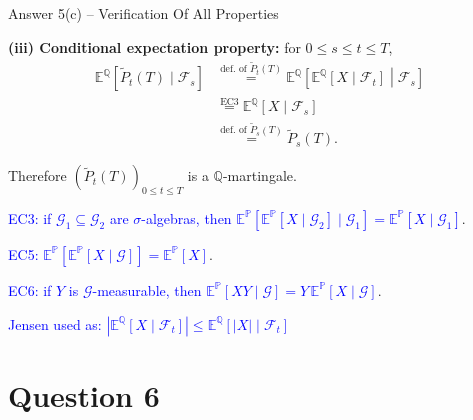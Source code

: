 \documentclass[compress]{beamer}
\begin{document}
\begin{frame}{Answer 5(c) -- Verification Of All Properties}
    {\small
    

    \textbf{(iii) Conditional expectation property:} for $0\le s\le t\le T$,
    \begin{align*}
        \mathbb E^{\mathbb Q}[\widetilde P_t(T)\mid\mathcal F_s]
        &\overset{\text{def. of }\widetilde P_t(T)}{=}
        \mathbb E^{\mathbb Q}\!\left[\mathbb E^{\mathbb Q}[X\mid\mathcal F_t]\middle|\mathcal F_s\right]\\
        &\overset{\text{EC3}}{=}
        \mathbb E^{\mathbb Q}[X\mid\mathcal F_s]\\
        &\overset{\text{def. of }\widetilde P_s(T)}{=}
        \widetilde P_s(T).
    \end{align*}

    Therefore $(\widetilde P_t(T))_{0\le t\le T}$ is a $\mathbb Q$-martingale.

	\vspace{4em}

	
	\textcolor{blue}{EC3: if $\mathcal G_1\subseteq \mathcal G_2$ are $\sigma$-algebras, then $\mathbb E^{\mathbb P}[\mathbb E^{\mathbb P}[X\mid\mathcal G_2]\mid\mathcal G_1]= \mathbb E^{\mathbb P}[X\mid\mathcal G_1]$}.
	
	\textcolor{blue}{EC5: $\mathbb E^{\mathbb P}[\mathbb E^{\mathbb P}[X\mid\mathcal G]]= \mathbb E^{\mathbb P}[X]$}.

	\textcolor{blue}{EC6: if $Y$ is $\mathcal G$-measurable, then $\mathbb E^{\mathbb P}[XY\mid\mathcal G]=Y\,\mathbb E^{\mathbb P}[X\mid\mathcal G]$}.
	
	\textcolor{blue}{Jensen used as: 
$|\mathbb{E}^{\mathbb{Q}}[X \mid \mathcal{F}_t]| \leq \mathbb{E}^{\mathbb{Q}}[|X| \mid \mathcal{F}_t]$
}
    }
\end{frame}


\section{Question 6}
\end{document}
